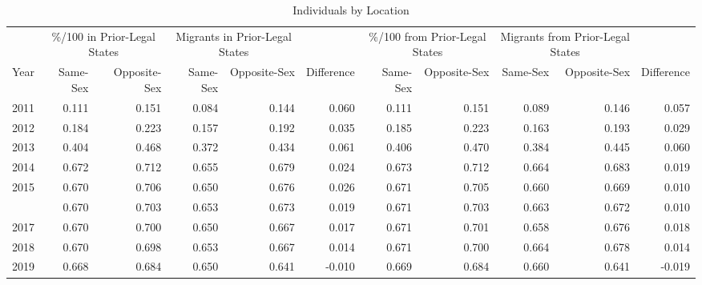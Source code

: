 \begin{table}

\caption{Individuals by Location}
\centering
\begin{tabular}[t]{rrrrrrrrrrr}
\toprule
\multicolumn{1}{c}{ } & \multicolumn{2}{c}{\%/100 in Prior-Legal States} & \multicolumn{2}{c}{Migrants in Prior-Legal States} & \multicolumn{1}{c}{ } & \multicolumn{2}{c}{\%/100 from Prior-Legal States} & \multicolumn{2}{c}{Migrants from Prior-Legal States} & \multicolumn{1}{c}{ } \\
\cmidrule(l{3pt}r{3pt}){2-3} \cmidrule(l{3pt}r{3pt}){4-5} \cmidrule(l{3pt}r{3pt}){7-8} \cmidrule(l{3pt}r{3pt}){9-10}
Year & Same-Sex & Opposite-Sex & Same-Sex & Opposite-Sex & Difference & Same-Sex & Opposite-Sex & Same-Sex & Opposite-Sex & Difference\\
\midrule
2011 & 0.111 & 0.151 & 0.084 & 0.144 & 0.060 & 0.111 & 0.151 & 0.089 & 0.146 & 0.057\\
2012 & 0.184 & 0.223 & 0.157 & 0.192 & 0.035 & 0.185 & 0.223 & 0.163 & 0.193 & 0.029\\
2013 & 0.404 & 0.468 & 0.372 & 0.434 & 0.061 & 0.406 & 0.470 & 0.384 & 0.445 & 0.060\\
2014 & 0.672 & 0.712 & 0.655 & 0.679 & 0.024 & 0.673 & 0.712 & 0.664 & 0.683 & 0.019\\
2015 & 0.670 & 0.706 & 0.650 & 0.676 & 0.026 & 0.671 & 0.705 & 0.660 & 0.669 & 0.010\\
\addlinespace
2016 & 0.670 & 0.703 & 0.653 & 0.673 & 0.019 & 0.671 & 0.703 & 0.663 & 0.672 & 0.010\\
2017 & 0.670 & 0.700 & 0.650 & 0.667 & 0.017 & 0.671 & 0.701 & 0.658 & 0.676 & 0.018\\
2018 & 0.670 & 0.698 & 0.653 & 0.667 & 0.014 & 0.671 & 0.700 & 0.664 & 0.678 & 0.014\\
2019 & 0.668 & 0.684 & 0.650 & 0.641 & -0.010 & 0.669 & 0.684 & 0.660 & 0.641 & -0.019\\
\bottomrule
\end{tabular}
\end{table}

